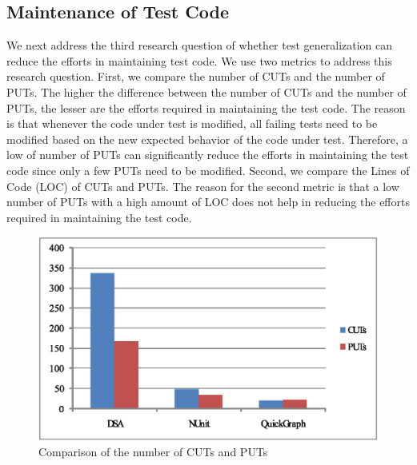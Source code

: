 \subsection{Maintenance of Test Code}

We next address the third research question of whether test generalization can reduce the efforts in maintaining test code. We use two metrics to address this research question. First, we compare the number of CUTs and the number of PUTs. The higher the difference between the number of CUTs and the number of PUTs, the lesser are the efforts required in maintaining the test code.
The reason is that whenever the code under test is modified, all failing tests need to be modified based on the new expected behavior of the code under test. Therefore, a low of number of PUTs can significantly reduce the efforts in maintaining the test code since only a few PUTs need to be modified. Second, we compare the Lines of Code (LOC) of CUTs and PUTs. The reason for the second metric is that a low number of PUTs with a high amount of LOC does not help in reducing the efforts required in maintaining the test code.

\begin{figure}[t]
\centering
\includegraphics[scale=0.45,clip]{charts/CUTs_PUTs_1.eps}\vspace*{-1ex}
\caption{\label{fig:cutsnputs}Comparison of the number of CUTs and PUTs}
\end{figure}

